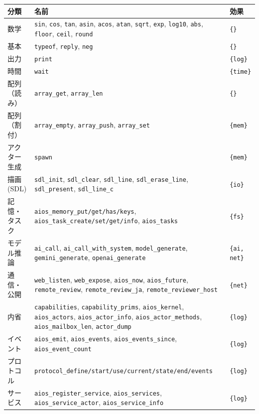 \documentclass[11pt,a4paper]{ltjsarticle}
\newcommand{\eff}[1]{\texttt{\{#1\}}}
\begin{document}
\begin{center}
\small
\begin{tabular}{@{}lp{9.4cm}l@{}}
\toprule
分類 & 名前 & 効果 \\
\midrule
数学 & \texttt{sin}, \texttt{cos}, \texttt{tan}, \texttt{asin}, \texttt{acos},
  \texttt{atan}, \texttt{sqrt}, \texttt{exp}, \texttt{log10}, \texttt{abs},
  \texttt{floor}, \texttt{ceil}, \texttt{round} & \eff{} \\
基本 & \texttt{typeof}, \texttt{reply}, \texttt{neg} & \eff{} \\
出力 & \texttt{print} & \eff{log} \\
時間 & \texttt{wait} & \eff{time} \\
配列（読み） & \texttt{array\_get}, \texttt{array\_len} & \eff{} \\
配列（割付） & \texttt{array\_empty}, \texttt{array\_push}, \texttt{array\_set} & \eff{mem} \\
アクター生成 & \texttt{spawn} & \eff{mem} \\
描画 (SDL) & \texttt{sdl\_init}, \texttt{sdl\_clear}, \texttt{sdl\_line},
  \texttt{sdl\_erase\_line}, \texttt{sdl\_present}, \texttt{sdl\_line\_c} & \eff{io} \\
記憶・タスク & \texttt{aios\_memory\_put/get/has/keys},
  \texttt{aios\_task\_create/set/get/info}, \texttt{aios\_tasks} & \eff{fs} \\
モデル推論 & \texttt{ai\_call}, \texttt{ai\_call\_with\_system},
  \texttt{model\_generate}, \texttt{gemini\_generate},
  \texttt{openai\_generate} & \eff{ai, net} \\
通信・公開 & \texttt{web\_listen}, \texttt{web\_expose},
  \texttt{aios\_now}, \texttt{aios\_future},
  \texttt{remote\_review}, \texttt{remote\_review\_ja},
  \texttt{remote\_reviewer\_host} & \eff{net} \\
内省 & \texttt{capabilities}, \texttt{capability\_prims},
  \texttt{aios\_kernel}, \texttt{aios\_actors}, \texttt{aios\_actor\_info},
  \texttt{aios\_actor\_methods}, \texttt{aios\_mailbox\_len},
  \texttt{actor\_dump} & \eff{log} \\
イベント & \texttt{aios\_emit}, \texttt{aios\_events},
  \texttt{aios\_events\_since}, \texttt{aios\_event\_count} & \eff{log} \\
プロトコル & \texttt{protocol\_define/start/use/current/state/end/events} & \eff{log} \\
サービス & \texttt{aios\_register\_service}, \texttt{aios\_services},
  \texttt{aios\_service\_actor}, \texttt{aios\_service\_info} & \eff{log} \\
\bottomrule
\end{tabular}
\end{center}
\end{document}

